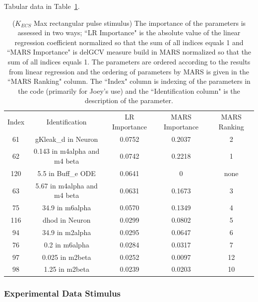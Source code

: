 \documentclass[12pt]{article}
\numberwithin{equation}{section}
\begin{document}
Tabular data in Table~\ref{qoi_K_ECS_Max_rec}.

\begin{table}[h]
\centering
\begin{tabular}{ccccc}
Index & Identification & LR Importance & MARS Importance & MARS Ranking \\

61 & gKleak\_d in Neuron & 0.0752 &  0.2037 & 2\\
62 & 0.143 in m4alpha and m4 beta & 0.0742 & 0.2218 & 1\\
120 & 5.5 in Buff\_e ODE & 0.0641 & 0 & none\\
63 &   5.67 in m4alpha and m4 beta & 0.0631 & 0.1673 & 3\\
75 & 34.9 in m6alpha & 0.0570 & 0.1349 & 4\\
116 & dhod in Neuron & 0.0299 & 0.0802 & 5\\
94 & 34.9 in m2alpha & 0.0295 & 0.0647 & 6\\
76 & 0.2 in m6alpha & 0.0284 & 0.0317 &7\\
97 & 0.025 in m2beta & 0.0252 & 0.0097 & 12\\
98 & 1.25 in m2beta & 0.0239 & 0.0203 & 10\\
\end{tabular}
\caption{ ($K_{ECS}$ Max rectangular pulse stimulus) The importance of the parameters is assessed in two ways; ``LR Importance" is the absolute value of the linear regression coefficient normalized so that the sum of all indices equals 1 and ``MARS Importance" is delGCV measure build in MARS normalized so that the sum of all indices equals 1. The parameters are ordered according to the results from linear regression and the ordering of parameters by MARS is given in the ``MARS Ranking" column. The ``Index" column is indexing of the parameters in the code (primarily for Joey's use) and the ``Identification column" is the description of the parameter.}
\label{qoi_K_ECS_Max_rec}
\end{table}

\newpage

\subsubsection{Experimental Data Stimulus}
\end{document}
